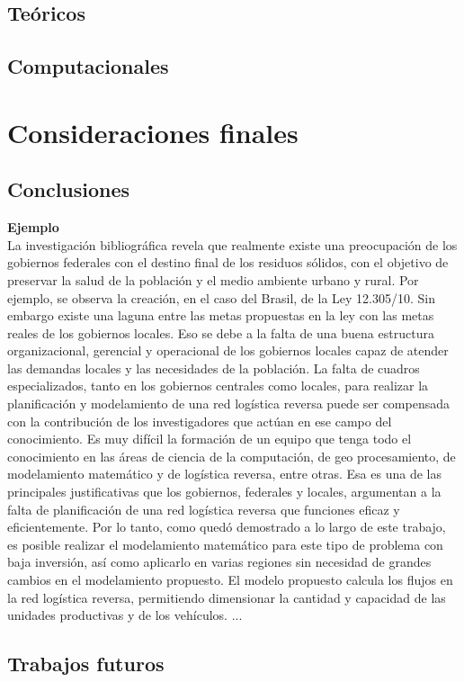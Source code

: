 \section{Teóricos}
\section{Computacionales}




\chapter{Consideraciones finales}



\section{Conclusiones}

{\bf Ejemplo}\\
La investigación bibliográfica revela que realmente existe una preocupación de los gobiernos federales con el destino final de los residuos sólidos, con el objetivo de preservar la salud de la población y el medio ambiente urbano y rural. Por ejemplo, se observa la creación, en el caso del Brasil, de la Ley 12.305/10. Sin embargo existe una laguna entre las metas propuestas en la ley con las metas reales de los gobiernos locales. Eso se debe a la falta de una buena estructura organizacional, gerencial y operacional de los gobiernos locales capaz de atender las demandas locales y las necesidades de la población.
\vskip 0.3cm
La falta de cuadros especializados, tanto en los gobiernos centrales como locales, para realizar la planificación y modelamiento de una red logística reversa puede ser compensada con la contribución de los investigadores que actúan en ese campo del conocimiento. Es muy difícil la formación de un equipo que tenga todo el conocimiento en las áreas de ciencia de la computación, de geo procesamiento, de modelamiento matemático y de logística reversa, entre otras. Esa es una de las principales justificativas que los gobiernos, federales y locales, argumentan a la falta de planificación de una red logística reversa que funciones eficaz y eficientemente. 
\vskip 0.3cm
Por lo tanto, como quedó demostrado a lo largo de este trabajo, es posible realizar el modelamiento matemático para este tipo de problema con baja inversión, así como aplicarlo en varias regiones sin necesidad de grandes cambios en el modelamiento propuesto. El modelo propuesto calcula los flujos en la red logística reversa, permitiendo dimensionar la cantidad y capacidad de las unidades productivas y de los vehículos. 
\vskip 0.3cm
...


\section{Trabajos futuros}



